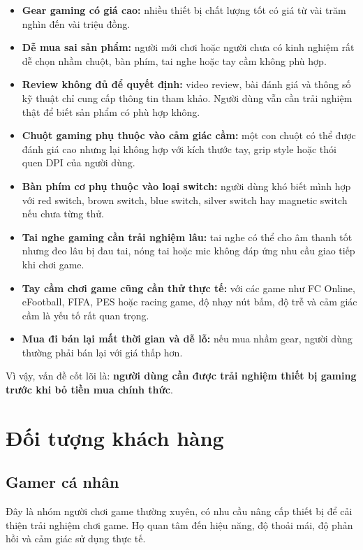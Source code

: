 \begin{itemize}
    \item \textbf{Gear gaming có giá cao:} nhiều thiết bị chất lượng tốt có giá từ vài trăm nghìn đến vài triệu đồng.
    \item \textbf{Dễ mua sai sản phẩm:} người mới chơi hoặc người chưa có kinh nghiệm rất dễ chọn nhầm chuột, bàn phím, tai nghe hoặc tay cầm không phù hợp.
    \item \textbf{Review không đủ để quyết định:} video review, bài đánh giá và thông số kỹ thuật chỉ cung cấp thông tin tham khảo. Người dùng vẫn cần trải nghiệm thật để biết sản phẩm có phù hợp không.
    \item \textbf{Chuột gaming phụ thuộc vào cảm giác cầm:} một con chuột có thể được đánh giá cao nhưng lại không hợp với kích thước tay, grip style hoặc thói quen DPI của người dùng.
    \item \textbf{Bàn phím cơ phụ thuộc vào loại switch:} người dùng khó biết mình hợp với red switch, brown switch, blue switch, silver switch hay magnetic switch nếu chưa từng thử.
    \item \textbf{Tai nghe gaming cần trải nghiệm lâu:} tai nghe có thể cho âm thanh tốt nhưng đeo lâu bị đau tai, nóng tai hoặc mic không đáp ứng nhu cầu giao tiếp khi chơi game.
    \item \textbf{Tay cầm chơi game cũng cần thử thực tế:} với các game như FC Online, eFootball, FIFA, PES hoặc racing game, độ nhạy nút bấm, độ trễ và cảm giác cầm là yếu tố rất quan trọng.
    \item \textbf{Mua đi bán lại mất thời gian và dễ lỗ:} nếu mua nhầm gear, người dùng thường phải bán lại với giá thấp hơn.
\end{itemize}

Vì vậy, vấn đề cốt lõi là: \textbf{người dùng cần được trải nghiệm thiết bị gaming trước khi bỏ tiền mua chính thức}.

\section{Đối tượng khách hàng}

\subsection{Gamer cá nhân}

Đây là nhóm người chơi game thường xuyên, có nhu cầu nâng cấp thiết bị để cải thiện trải nghiệm chơi game. Họ quan tâm đến hiệu năng, độ thoải mái, độ phản hồi và cảm giác sử dụng thực tế.

